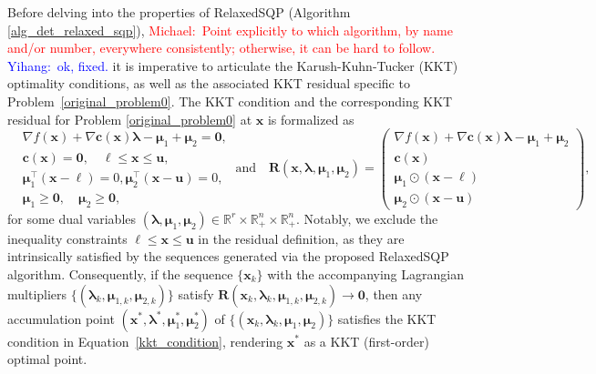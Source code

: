 \documentclass[aos]{imsart}
\numberwithin{equation}{section}
\theoremstyle{plain}
\newcommand{\michael}[1]{\textcolor{red}{Michael:\ #1}}
\newcommand{\yihang}[1]{\textcolor{blue}{Yihang:\ #1}}
\begin{document}
Before delving into the properties of RelaxedSQP (Algorithm \ref{alg_det_relaxed_sqp}), 
\michael{Point explicitly to which algorithm, by name and/or number, everywhere consistently; otherwise, it can be hard to follow.} \yihang{ok, fixed.}
it is imperative to articulate the Karush-Kuhn-Tucker (KKT) optimality conditions, as well as the associated KKT residual specific to Problem~\eqref{original_problem0}. 
    The KKT condition and  the corresponding KKT residual for Problem \eqref{original_problem0} at $\bm{x}$ is formalized as
    \begin{equation}
    \label{kkt_condition}
        \begin{split}
            & \nabla f (\bm{x}) + \nabla \bm{c}(\bm{x}) \bm{\lambda} - \bm{\mu}_1 + \bm{\mu}_2 = \bm{0},\\
            & \bm{c}(\bm{x}) = \bm{0},\quad \bm{\ell} \leq \bm{x} \leq \bm{u},\\
            & \bm{\mu}_1^{\top} (\bm{x} - \bm{\ell}) = 0,  \bm{\mu}_2^{\top} (\bm{x} - \bm{u}) = 0,\\
            & \bm{\mu}_1 \geq \bm{0}, \quad \bm{\mu}_2 \geq \bm{0},
        \end{split} ~\text{and} \quad
        \bm{R}(\bm{x},\bm{\lambda},\bm{\mu}_1,\bm{\mu}_2) = \left ( \begin{array}{c}
             \nabla f (\bm{x}) + \nabla \bm{c}(\bm{x}) \bm{\lambda} - \bm{\mu}_1 + \bm{\mu}_2  \\
            \bm{c}(\bm{x}) \\
            \bm{\mu}_1 \odot (\bm{x} - \bm{\ell})\\
            \bm{\mu}_2 \odot (\bm{x} - \bm{u})
        \end{array}\right),
    \end{equation}
    for some dual variables $(\bm{\lambda}, \bm{\mu}_1, \bm{\mu}_2) \in \mathbb{R}^{r} \times \mathbb{R}^{n}_{+} \times \mathbb{R}^{n}_{+}$. Notably, we exclude the inequality constraints $\bm{\ell} \leq \bm{x} \leq \bm{u}$ in the residual definition, as they are intrinsically satisfied by the sequences generated via the proposed RelaxedSQP algorithm.
    Consequently, if the sequence $\{\bm{x}_k\}$ with the accompanying Lagrangian multipliers $\{(\bm{\lambda}_k, \bm{\mu}_{1,k}, \bm{\mu}_{2,k})\}$ satisfy $\bm{R}(\bm{x}_k, \bm{\lambda}_k, \bm{\mu}_{1,k}, \bm{\mu}_{2,k}) \to \bm{0}$, then any accumulation point $(\bm{x}^{*},\bm{\lambda}^{*},\bm{\mu}_1^{*},\bm{\mu}_2^{*})$ of $\{(\bm{x}_k,\bm{\lambda}_k, \bm{\mu}_1, \bm{\mu}_2)\}$ satisfies the KKT condition in Equation~\eqref{kkt_condition}, rendering $\bm{x}^{*}$ as a KKT (first-order) optimal point.
\end{document}
